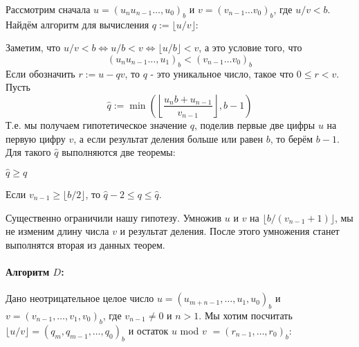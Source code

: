 \begin{itemize}
   Рассмотрим сначала $u=(u_nu_{n-1}\dots,u_0)_b$ и $v=(v_{n-1}\dots v_0)_b$, где $u/v <b$. Найдём алгоритм для вычисления $q:=\lfloor u/v \rfloor$:

   Заметим, что $u/v<b\Leftrightarrow u/b < v\Leftrightarrow \lfloor u/b\rfloor < v$, а это условие того, что \[(u_nu_{n-1}\dots,u_1)_b <  (v_{n-1}\dots v_0)_b\]
   Если обозначить $r:=u - qv$, то $q$ - это уникальное число, такое что $0\leqslant r <v$. Пусть
   \[\hat{q}:=\min \left(\left\lfloor \frac{u_nb + u_{n-1}}{v_{n-1}}\right\rfloor, b-1\right)\]
   Т.е. мы получаем гипотетическое значение $q$, поделив первые две цифры $u$ на первую цифру $v$, а если результат деления больше или равен $b$, то берём $b-1$. Для такого $\hat{q}$ выполняются две теоремы: 
   \begin{theorem}
    $\hat{q}\geqslant q$
   \end{theorem}
   \begin{theorem}
     Если $v_{n-1}\geqslant \lfloor b/2\rfloor$, то $\hat{q}-2\leqslant q\leqslant \hat{q}$.
   \end{theorem}
   Существенно ограничили нашу гипотезу. Умножив $u$ и $v$ на $\lfloor b/(v_{n-1}+1)\rfloor$, мы не изменим длину числа $v$ и результат деления. После этого умножения станет выполнятся вторая из данных теорем.

   \paragraph{Алгоритм $D$:} Дано неотрицательное целое число $u = (u_{m+n-1},\dots,u_1,u_0)_b$ и $v = (v_{n-1},\dots,v_1,v_0)_b$, где $v_{n-1}\neq 0$ и $n>1$. Мы хотим посчитать $\lfloor u/v\rfloor = (q_m,q_{m-1},\dots,q_0)_b$ и остаток $u$ mod $v$ $= (r_{n-1},\dots,r_0)_b$:


\end{itemize}
